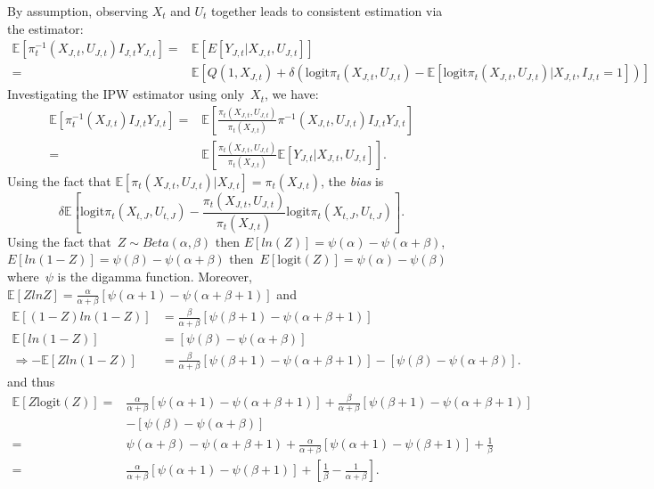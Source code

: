 \documentclass[11pt]{amsart}
\numberwithin{equation}{section}
\theoremstyle{plain}
\def\logit{\text{logit}}
\def\EE{\mathbb{E}}
\begin{document}
 By assumption, observing $X_t$ and $U_t$ together leads to consistent estimation via the estimator:
\begin{align*}
\EE\left[\pi^{-1}_t (X_{J,t}, U_{J,t}) I_{J,t} Y_{J,t} \right]
= &\EE[ E[ Y_{J,t} | X_{J,t}, U_{J,t}] ] \\
= &\EE \left[ Q(1,X_{J,t}) + \delta \left( \logit \pi_t (X_{J,t}, U_{J,t}) - \EE \left[ \logit \pi_t (X_{J,t}, U_{J,t}) | X_{J,t}, I_{J,t} = 1 \right] \right) \right]
\end{align*}
 Investigating the IPW estimator using only~$X_t$, we have:
\begin{align*}
\EE\left[\pi^{-1}_t (X_{J,t}) I_{J,t} Y_{J,t} \right]
=&\EE\left[\frac{\pi_t (X_{J,t}, U_{J,t})}{\pi_t (X_{J,t})} \pi^{-1} (X_{J,t}, U_{J,t}) I_{J,t} Y_{J,t} \right] \\
= &\EE\left[ \frac{\pi_t (X_{J,t}, U_{J,t})}{\pi_t (X_{J,t})} \EE[ Y_{J,t} | X_{J,t}, U_{J,t}] \right].
\end{align*}
Using the fact that $\EE \left[ \pi_t (X_{J,t}, U_{J,t}) | X_{J,t} \right] = \pi_{t} (X_{J,t})$, the \emph{bias} is
$$
\delta \EE \left[ \logit \pi_t (X_{t,J}, U_{t,J}) - \frac{\pi_t (X_{J,t}, U_{J,t})}{\pi_t (X_{J,t})} \logit \pi_t (X_{t,J}, U_{t,J}) \right].
$$
Using the fact that~$Z \sim Beta(\alpha, \beta)$ then $E[ ln(Z) ] = \psi(\alpha) - \psi(\alpha + \beta)$, $E[ ln(1-Z) ] = \psi(\beta) - \psi(\alpha + \beta)$ then~$E[ \logit (Z) ] = \psi(\alpha) - \psi(\beta)$ where~$\psi$ is the digamma function.  Moreover,~$\EE[ Z ln Z ] = \frac{\alpha}{\alpha + \beta} \left[ \psi(\alpha + 1) - \psi(\alpha + \beta +1) \right]$ and
\begin{align*}
\EE \left[ (1-Z) ln(1-Z) \right] &= \frac{\beta}{\alpha + \beta} \left[ \psi(\beta + 1) - \psi(\alpha + \beta +1) \right] \\
\EE \left[ ln(1-Z) \right] &= \left[ \psi(\beta) - \psi(\alpha + \beta) \right] \\
\Rightarrow - \EE \left[ Z ln(1-Z) \right] &= \frac{\beta}{\alpha + \beta} \left[ \psi(\beta + 1) - \psi(\alpha + \beta +1) \right] - \left[ \psi(\beta) - \psi(\alpha + \beta) \right].
\end{align*}
and thus
\begin{align*}
\EE \left[ Z \logit(Z) \right] =& \frac{\alpha}{\alpha + \beta} \left[ \psi(\alpha + 1) - \psi(\alpha + \beta +1) \right] + \frac{\beta}{\alpha + \beta} \left[ \psi(\beta + 1) - \psi(\alpha + \beta +1) \right] \\
&- \left[ \psi(\beta) - \psi(\alpha + \beta) \right] \\
=& \psi(\alpha + \beta) - \psi(\alpha + \beta +1) + \frac{\alpha}{\alpha + \beta} \left[ \psi(\alpha + 1) - \psi(\beta+1) \right] + \frac{1}{\beta} \\
=& \frac{\alpha}{\alpha + \beta} \left[ \psi(\alpha + 1) - \psi(\beta+1) \right] + \left[ \frac{1}{\beta} - \frac{1}{\alpha + \beta} \right].
\end{align*}
\end{document}
